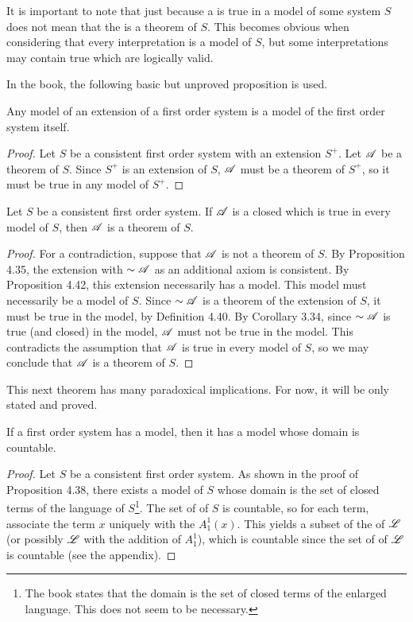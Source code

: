 It is important to note that just because a \wf{} is true in a model of some system \(S\) does not mean that the \wf{} is a theorem of \(S\). This becomes obvious when considering that every interpretation is a model of \(S\), but some interpretations may contain true \wfs{} which are logically valid.

In the book, the following basic but unproved proposition is used.
\begin{proposition*}
  Any model of an extension of a first order system is a model of the first order system itself.

  \begin{proof}
    Let \(S\) be a consistent first order system with an extension \(S^+\). Let \(\mathscr{A}\) be a theorem of \(S\). Since \(S^+\) is an extension of \(S\), \(\mathscr{A}\) must be a theorem of \(S^+\), so it must be true in any model of \(S^+\).
  \end{proof}
\end{proposition*}

\setcounter{definition}{43}
\begin{proposition}
  Let \(S\) be a consistent first order system. If \(\mathscr{A}\) is a closed \wf{} which is true in every model of \(S\), then \(\mathscr{A}\) is a theorem of \(S\).

  \begin{proof}
    For a contradiction, suppose that \(\mathscr{A}\) is not a theorem of \(S\). By Proposition 4.35, the extension with \(\sim\mathscr{A}\) as an additional axiom is consistent. By Proposition 4.42, this extension necessarily has a model. This model must necessarily be a model of \(S\). Since \(\sim\mathscr{A}\) is a theorem of the extension of \(S\), it must be true in the model, by Definition 4.40. By Corollary 3.34, since \(\sim\mathscr{A}\) is true (and closed) in the model, \(\mathscr{A}\) must not be true in the model. This contradicts the assumption that \(\mathscr{A}\) is true in every model of \(S\), so we may conclude that \(\mathscr{A}\) is a theorem of \(S\).
  \end{proof}
\end{proposition}

This next theorem has many paradoxical implications. For now, it will be only stated and proved.

\begin{proposition}
  If a first order system has a model, then it has a model whose domain is countable.

  \begin{proof}
    Let \(S\) be a consistent first order system. As shown in the proof of Proposition 4.38, there exists a model of \(S\) whose domain is the set of closed terms of the language of \(S\)\footnote{The book states that the domain is the set of closed terms of the enlarged language. This does not seem to be necessary.}. The set of \wfs{} of \(S\) is countable, so for each term, associate the term \(x\) uniquely with the \wf{} \(A^1_1(x)\). This yields a subset of the \wfs{} of \(\mathscr{L}\) (or possibly \(\mathscr{L}\) with the addition of \(A^1_1\)), which is countable since the set of \wfs{} of \(\mathscr{L}\) is countable (see the appendix).
  \end{proof}
\end{proposition}

